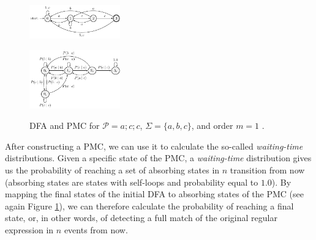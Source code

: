 \begin{figure}[!ht]
\begin{centering}

\includegraphics[width=0.35\textwidth]{./chapters/figures/forecasting/dfasr.pdf}
\label{fig:dfatcc}

\hfill

\includegraphics[width=0.35\textwidth]{./chapters/figures/forecasting/pmcr1.pdf}
\label{fig:mctcc1}

\caption{DFA and PMC for $\mathcal{P}=a ; c ; c$,  $\Sigma=\{a,b,c\}$, and order $m=1$  \cite{alevizos2017event}.}
\label{fig:dfa_mc_example}
\end{centering}
\end{figure}


\par After constructing a PMC, we can use it to calculate the so-called \textit{waiting-time} distributions.
Given a specific state of the PMC, a \textit{waiting-time} distribution gives us the probability of reaching a set of absorbing states in $n$ transition from now (absorbing states are states with self-loops and probability equal to $1.0$).
By mapping the final states of the initial DFA to absorbing states of the PMC
(see again Figure \ref{fig:dfa_mc_example}),
we can therefore calculate the probability of reaching a final state,
or, in other words, of detecting a full match of the original regular expression in $n$ events from now.

